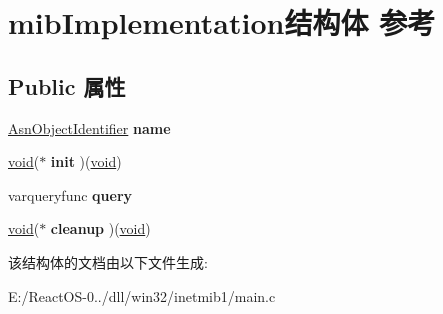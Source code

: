 \hypertarget{structmib_implementation}{}\section{mib\+Implementation结构体 参考}
\label{structmib_implementation}
\subsection*{Public 属性}
\begin{DoxyCompactItemize}
\item 
\mbox{\label{structmib_implementation_ab42f761c897004238d0a1fc5c1e8fbf1}} 
\hyperlink{struct_asn_object_identifier}{Asn\+Object\+Identifier} {\bfseries name}
\item 
\mbox{\label{structmib_implementation_a91144b278f945166658b9886f7d6dacd}} 
\hyperlink{interfacevoid}{void}($\ast$ {\bfseries init} )(\hyperlink{interfacevoid}{void})
\item 
\mbox{\label{structmib_implementation_ae86324e1e0adb38e0603828eeaf3d17a}} 
varqueryfunc {\bfseries query}
\item 
\mbox{\label{structmib_implementation_a899c8c296d7c0e5766cdf4b1dded14f5}} 
\hyperlink{interfacevoid}{void}($\ast$ {\bfseries cleanup} )(\hyperlink{interfacevoid}{void})
\end{DoxyCompactItemize}


该结构体的文档由以下文件生成\+:\begin{DoxyCompactItemize}
\item 
E\+:/\+React\+O\+S-\/0../dll/win32/inetmib1/main.\+c\end{DoxyCompactItemize}
